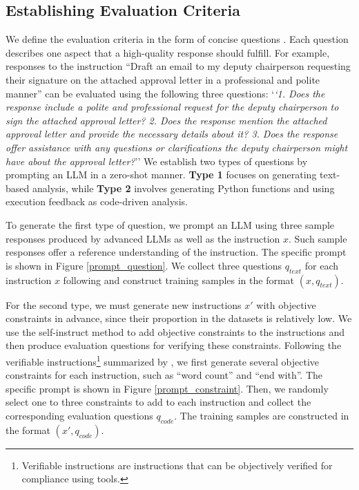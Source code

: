 \subsection{Establishing Evaluation Criteria}\label{subsec:criteria}
We define the evaluation criteria in the form of concise questions \cite{llmbar, prometheus2}. Each question describes one aspect that a high-quality response should fulfill. For example, responses to the instruction ``Draft an email to my deputy chairperson requesting their signature on the attached approval letter in a professional and polite manner'' can be evaluated using the following three questions: `\textit{`1. Does the response include a polite and professional request for the deputy chairperson to sign the attached approval letter? 2. Does the response mention the attached approval letter and provide the necessary details about it? 3. Does the response offer assistance with any questions or clarifications the deputy chairperson might have about the approval letter?}'' We establish two types of questions by prompting an LLM in a zero-shot manner. \textbf{Type 1} focuses on generating text-based analysis, while \textbf{Type 2} involves generating Python functions and using execution feedback as code-driven analysis.

To generate the first type of question, we prompt an LLM using three sample responses produced by advanced LLMs as well as the instruction $x$. Such sample responses offer a reference understanding of the instruction. The specific prompt is shown in Figure \ref{prompt_question}. We collect three questions $q_{text}$ for each instruction $x$ following \citet{llmbar} and construct training samples in the format $(x, q_{text})$.

For the second type, we must generate new instructions $x'$ with objective constraints in advance, since their proportion in the datasets is relatively low. We use the self-instruct \cite{self-instruct} method to add objective constraints to the instructions and then produce evaluation questions for verifying these constraints. Following the verifiable instructions\footnote{Verifiable instructions are instructions that can be objectively verified for compliance using tools.} summarized by \citet{ifeval}, we first generate several objective constraints for each instruction, such as ``word count'' and ``end with''. The specific prompt is shown in Figure \ref{prompt_constraint}. Then, we randomly select one to three constraints to add to each instruction and collect the corresponding evaluation questions $q_{code}$. The training samples are constructed in the format $(x', q_{code})$.


